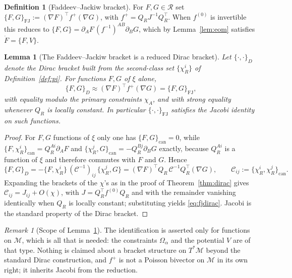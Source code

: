 \documentclass[12pt]{article}
\theoremstyle{plain}
\newtheorem{lemma}[theorem]{Lemma}
\theoremstyle{definition}
\newtheorem{definition}[theorem]{Definition}
\theoremstyle{remark}
\newtheorem{remark}[theorem]{Remark}
\newcommand{\pd}[1]{\partial_{#1}}
\newcommand{\Om}{\Omega}
\newcommand{\Mm}{\mathcal{M}}
\newcommand{\Rring}{\mathcal{R}}
\newcommand{\FJ}{\mathrm{FJ}}
\begin{document}
	\begin{definition}[Faddeev--Jackiw bracket]
		\label{def:fjbracket}
		For $F,G\in\Rring$ set
		$\{F,G\}_{\FJ}:=(\nabla F)^{\top}f^{+}(\nabla G)$, with
		$f^{+}=Q_{R}J^{-1}Q_{R}^{\top}$. When $f^{(0)}$ is invertible this reduces to
		$\{F,G\}=\pd{A}F\,(f^{-1})^{AB}\pd{B}G$, which by Lemma~\ref{lem:eom} satisfies
		$\dot F=\{F,V\}$.
	\end{definition}
	
	\begin{lemma}[The Faddeev--Jackiw bracket is a reduced Dirac bracket]
		\label{lem:fjdirac}
		Let $\{\cdot,\cdot\}_{D}$ denote the Dirac bracket built from the second-class
		set $\{\chi_{R}^{i}\}$ of Definition~\ref{def:pi}. For functions $F,G$ of $\xi$
		alone,
		\begin{equation}
			\{F,G\}_{D}\approx(\nabla F)^{\top}f^{+}(\nabla G)=\{F,G\}_{\FJ} ,
			\label{eq:fjdirac}
		\end{equation}
		with equality modulo the primary constraints $\chi_{A}$, and with strong
		equality whenever $Q_{R}$ is locally constant. In particular
		$\{\cdot,\cdot\}_{\FJ}$ satisfies the Jacobi identity on such functions.
	\end{lemma}
	
	\begin{proof}
		For $F,G$ functions of $\xi$ only one has $\{F,G\}_{\mathrm{can}}=0$, while
		$\{F,\chi_{R}^{i}\}_{\mathrm{can}}=Q_{R}^{Ai}\pd{A}F$ and
		$\{\chi_{R}^{j},G\}_{\mathrm{can}}=-Q_{R}^{Bj}\pd{B}G$ exactly, because
		$Q_{R}^{Ai}$ is a function of $\xi$ and therefore commutes with $F$ and $G$.
		Hence
		\[
		\{F,G\}_{D}
		=-\{F,\chi_{R}^{i}\}\,(\mathcal{C}^{-1})_{ij}\,\{\chi_{R}^{j},G\}
		=(\nabla F)^{\top}Q_{R}\,\mathcal{C}^{-1}Q_{R}^{\top}(\nabla G),
		\qquad
		\mathcal{C}_{ij}:=\{\chi_{R}^{i},\chi_{R}^{j}\}_{\mathrm{can}} .
		\]
		Expanding the brackets of the $\chi$'s as in the proof of Theorem~\ref{thm:dirac} gives $\mathcal{C}_{ij}=J_{ij}+O(\chi)$, with
		$J=Q_{R}^{\top}f^{(0)}Q_{R}$ and with the remainder vanishing identically when
		$Q_{R}$ is locally constant; substituting yields \eqref{eq:fjdirac}. Jacobi is
		the standard property of the Dirac bracket.
	\end{proof}
	
	\begin{remark}[Scope of Lemma~\ref{lem:fjdirac}]
		The identification is asserted only for functions on $\Mm$, which is all that is
		needed: the constraints $\Om_{\alpha}$ and the potential $V$ are of that type.
		Nothing is claimed about a bracket structure on $T^{*}\Mm$ beyond the standard
		Dirac construction, and $f^{+}$ is not a Poisson bivector on $\Mm$ in its own
		right; it inherits Jacobi from the reduction.
	\end{remark}
	
\end{document}
